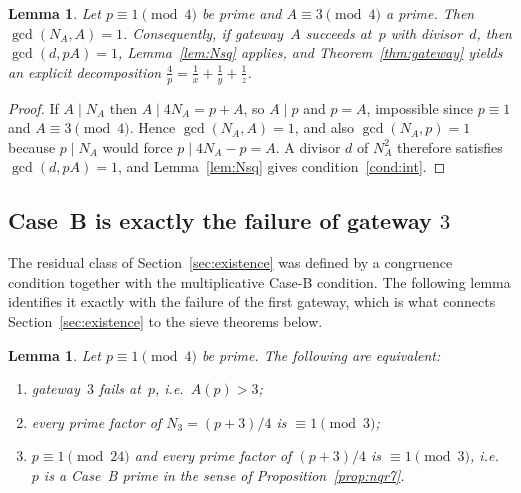 \documentclass[12pt]{amsart}
\newtheorem{lemma}[theorem]{Lemma}
\theoremstyle{definition}
\theoremstyle{remark}
\begin{document}
\begin{lemma}\label{lem:gcdNA}
Let $p \equiv 1 \pmod 4$ be prime and $A \equiv 3 \pmod 4$ a prime.
Then $\gcd(N_A, A) = 1$.  Consequently, if gateway~$A$ succeeds at~$p$
with divisor~$d$, then $\gcd(d, pA) = 1$, Lemma~\ref{lem:Nsq} applies,
and Theorem~\ref{thm:gateway} yields an explicit decomposition
$\frac{4}{p} = \frac{1}{x} + \frac{1}{y} + \frac{1}{z}$.
\end{lemma}

\begin{proof}
If $A \mid N_A$ then $A \mid 4N_A = p + A$, so $A \mid p$ and $p = A$,
impossible since $p \equiv 1$ and $A \equiv 3 \pmod 4$.
Hence $\gcd(N_A, A) = 1$, and also $\gcd(N_A, p) = 1$ because
$p \mid N_A$ would force $p \mid 4N_A - p = A$.
A divisor $d$ of $N_A^2$ therefore satisfies $\gcd(d, pA) = 1$, and
Lemma~\ref{lem:Nsq} gives condition~\ref{cond:int}.
\end{proof}

\subsection{Case~B is exactly the failure of gateway \texorpdfstring{$3$}{3}}

The residual class of Section~\ref{sec:existence} was defined by a
congruence condition together with the multiplicative Case-B condition.
The following lemma identifies it exactly with the failure of the first
gateway, which is what connects Section~\ref{sec:existence} to the
sieve theorems below.

\begin{lemma}\label{lem:caseB}
Let $p \equiv 1 \pmod 4$ be prime.  The following are equivalent:
\begin{enumerate}[label=\textup{(\roman*)}]
  \item\label{cb:fail} gateway~$3$ fails at~$p$, i.e.\ $A(p) > 3$;
  \item\label{cb:mult} every prime factor of $N_3 = (p+3)/4$ is
    $\equiv 1 \pmod 3$;
  \item\label{cb:caseB} $p \equiv 1 \pmod{24}$ and every prime factor
    of $(p+3)/4$ is $\equiv 1 \pmod 3$, i.e.\ $p$ is a Case~B prime in
    the sense of Proposition~\ref{prop:nqr7}.
\end{enumerate}
\end{lemma}
\end{document}
